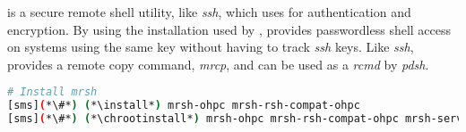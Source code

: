 \mrsh{} is a secure remote shell utility, like {\em ssh}, which uses
\MUNGE{} for authentication and encryption. By using the \MUNGE{}
installation used by \SLURM{}, \mrsh{} provides passwordless shell
access on systems using the same \MUNGE{} key without having to track
{\em ssh} keys. Like {\em ssh}, \mrsh{} provides a remote copy command,
{\em mrcp}, and can be used as a {\em rcmd} by {\em pdsh}.

\begin{lstlisting}[language=bash,keywords={},upquote=true]
# Install mrsh
[sms](*\#*) (*\install*) mrsh-ohpc mrsh-rsh-compat-ohpc
[sms](*\#*) (*\chrootinstall*) mrsh-ohpc mrsh-rsh-compat-ohpc mrsh-server-ohpc
\end{lstlisting}

